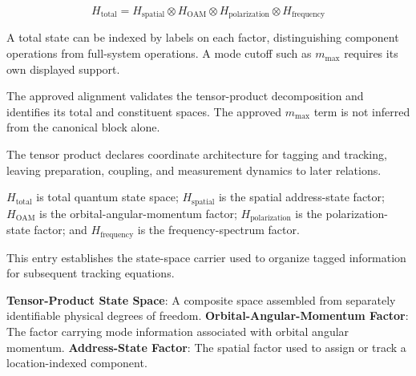 
\[
H_{\mathrm{total}}=H_{\mathrm{spatial}}\otimes H_{\mathrm{OAM}}\otimes H_{\mathrm{polarization}}\otimes H_{\mathrm{frequency}}
\]


A total state can be indexed by labels on each factor, distinguishing component operations from full-system operations. A mode cutoff such as \(m_{\max}\) requires its own displayed support.


The approved alignment validates the tensor-product decomposition and identifies its total and constituent spaces. The approved \(m_{\max}\) term is not inferred from the canonical block alone.


The tensor product declares coordinate architecture for tagging and tracking, leaving preparation, coupling, and measurement dynamics to later relations.


\(H_{\mathrm{total}}\) is total quantum state space; \(H_{\mathrm{spatial}}\) is the spatial address-state factor; \(H_{\mathrm{OAM}}\) is the orbital-angular-momentum factor; \(H_{\mathrm{polarization}}\) is the polarization-state factor; and \(H_{\mathrm{frequency}}\) is the frequency-spectrum factor.


This entry establishes the state-space carrier used to organize tagged information for subsequent tracking equations.


\noindent \textbf{Tensor-Product State Space}: A composite space assembled from separately identifiable physical degrees of freedom. \enspace\textbullet\enspace \textbf{Orbital-Angular-Momentum Factor}: The factor carrying mode information associated with orbital angular momentum. \enspace\textbullet\enspace \textbf{Address-State Factor}: The spatial factor used to assign or track a location-indexed component.\par

\endgroup

\ifTZPDarkEdition
{}
\fi


